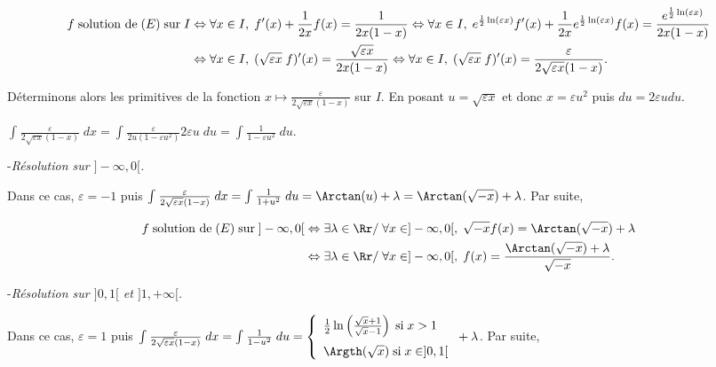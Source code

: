 {\begin{enumerate}
{\begin{align*}\ensuremath
f\;\text{solution de}\;(E)\;\text{sur}\;I&\Leftrightarrow\forall x\in I,\;f'(x)+ \frac{1}{2x}f(x)= \frac{1}{2x(1-x)}\Leftrightarrow\forall x\in I,\;e^{\frac{1}{2}\ln(\varepsilon x)}f'(x)+ \frac{1}{2x}e^{\frac{1}{2}\ln(\varepsilon x)}f(x)= \frac{e^{\frac{1}{2}\ln(\varepsilon x)}}{2x(1-x)}\\
 &\Leftrightarrow\forall x\in I,\;(\sqrt{\varepsilon x}\;f)'(x)= \frac{\sqrt{\varepsilon x}}{2x(1-x)}\Leftrightarrow\forall x\in I,\;(\sqrt{\varepsilon x}\;f)'(x)= \frac{
 \varepsilon}{2\sqrt{\varepsilon x}(1-x)}.
\end{align*}

Déterminons alors les primitives de la fonction $x\mapsto \frac{
 \varepsilon}{2\sqrt{\varepsilon x}(1-x)}$ sur $I$. En posant $u=\sqrt{\varepsilon x}$ et donc $x=\varepsilon u^2$ puis $du=2\varepsilon udu$.
 
\begin{center}
$\int_{}^{} \frac{
 \varepsilon}{2\sqrt{\varepsilon x}(1-x)}\;dx=\int_{}^{} \frac{\varepsilon}{2u(1-\varepsilon u^2)}2\varepsilon u\;du=\int_{}^{} \frac{1}{1-\varepsilon u^2}\;du$.
\end{center}

-\textit{Résolution sur $]-\infty,0[$.}

Dans ce cas, $\varepsilon =-1$ puis $\int_{}^{} \frac{
 \varepsilon}{2\sqrt{\varepsilon x}(1-x)}\;dx=\int_{}^{} \frac{1}{1+u^2}\;du=\Arctan(u)+\lambda=\Arctan(\sqrt{-x})+\lambda$. Par suite,
 
 \begin{align*}\ensuremath
 f\;\text{solution de}\;(E)\;\text{sur}\;]-\infty,0[&\Leftrightarrow\exists\lambda\in\Rr/\;\forall x\in]-\infty,0[,\;\sqrt{-x}f(x)=\Arctan(\sqrt{-x})+\lambda\\
  &\Leftrightarrow\exists\lambda\in\Rr/\;\forall x\in]-\infty,0[,\;f(x)= \frac{\Arctan(\sqrt{-x})+\lambda}{\sqrt{-x}}.
 \end{align*}

\begin{center}
\fbox{
$\mathcal{S}_{]-\infty,0[}=\left\{x\mapsto \frac{\Arctan(\sqrt{-x})+\lambda}{\sqrt{-x}},\;\lambda\in\Rr\right\}$.
}
\end{center}

-\textit{Résolution sur $]0,1[$ et $]1,+\infty[$.}

Dans ce cas, $\varepsilon =1$ puis $\int_{}^{} \frac{
 \varepsilon}{2\sqrt{\varepsilon x}(1-x)}\;dx=\int_{}^{} \frac{1}{1-u^2}\;du=\left\{
 \begin{array}{l}
  \frac{1}{2}\ln\left(
  \frac{\sqrt{x}+1}{\sqrt{x}-1}\right)\;\text{si}\;x>1
 \\
\rule{0mm}{5mm} \Argth(\sqrt{x})\;\text{si}\;x\in]0,1[
 \end{array}
 \right.+\lambda$. Par suite,

}
\end{enumerate}}

